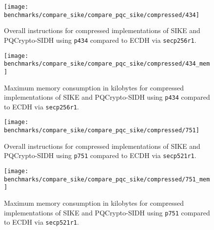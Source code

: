 \begin{figure}[H]
  \centering
  \texttt{[image: benchmarks/compare\_sike/compare\_pqc\_sike/compressed/434]}
  \caption[Overall instructions for compressed implementations of \gls{SIKE} and \gls{PQCrypto-SIDH} using \texttt{p434}]
  {Overall instructions for compressed implementations of \gls{SIKE} and \gls{PQCrypto-SIDH} using \texttt{p434} compared to \gls{ECDH} via \texttt{secp256r1}.}
  \label{fig:results_sike_pqc_comp_434}
\end{figure}

\begin{figure}[H]
  \centering
  \texttt{[image: benchmarks/compare\_sike/compare\_pqc\_sike/compressed/434\_mem]}
  \caption[Maximum memory consumption in kilobytes for compressed implementations of \gls{SIKE} and \gls{PQCrypto-SIDH} using \texttt{p434}]
  {Maximum memory consumption in kilobytes for compressed implementations of \gls{SIKE} and \gls{PQCrypto-SIDH} using \texttt{p434} compared to \gls{ECDH} via \texttt{secp256r1}.}
  \label{fig:results_sike_pqc_comp_434_mem}
\end{figure}

\begin{figure}[H]
  \centering
  \texttt{[image: benchmarks/compare\_sike/compare\_pqc\_sike/compressed/751]}
  \caption[Overall instructions for compressed implementations of \gls{SIKE} and \gls{PQCrypto-SIDH} using \texttt{p751}]
  {Overall instructions for compressed implementations of \gls{SIKE} and \gls{PQCrypto-SIDH} using \texttt{p751} compared to \gls{ECDH} via \texttt{secp521r1}.}
  \label{fig:results_sike_pqc_comp_751}
\end{figure}

\begin{figure}[H]
  \centering
  \texttt{[image: benchmarks/compare\_sike/compare\_pqc\_sike/compressed/751\_mem]}
  \caption[Maximum memory consumption in kilobytes for compressed implementations of \gls{SIKE} and \gls{PQCrypto-SIDH} using \texttt{p751}]
  {Maximum memory consumption in kilobytes for compressed implementations of \gls{SIKE} and \gls{PQCrypto-SIDH} using \texttt{p751} compared to \gls{ECDH} via \texttt{secp521r1}.}
  \label{fig:results_sike_pqc_comp_751_mem}
\end{figure}

